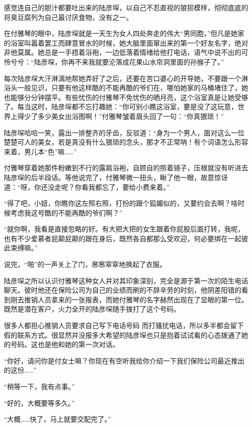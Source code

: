 \documentclass[11pt,a4paper]{article}
\begin{document}
感觉连自己的胆汁都要吐出来的陆彦堔，以自己不忍直视的狼狈模样，彻彻底底的将臭豆腐列为自己最讨厌食物，没有之一。﻿﻿

在付雅琴的眼中，陆彦堔就是一天生为女人四处奔走的伟大“男同胞，”但凡是她家的浴室叫嚣着罢工而肆意冒水的时候，她大脑里面窜出来的第一个好友名字，绝对非他莫属。她总是一手捂着浴袍，一边低落着情绪给他打电话，语气中说不出的可怜兮兮：“陆彦堔，你再不来我就要沦落成花果山水帘洞里面的孙猴子了。”﻿﻿

每次陆彦堔大汗淋漓地帮她弄好了之后，还要在苦口婆心的开导她，不要跟一个淋浴头一般见识，只要有他这样酷的不能再酷的爷们在，哪怕她家的马桶堵住了，她也能够分分钟摆平。有些忧伤的付雅琴不免忧伤的晒月亮，这个浴室真是让她受够了。每当这时，陆彦堔都不忘打趣她：“你可别小瞧这浴室，要是没了这玩意，世界上得少了多少美女出浴图啊！”付雅琴皱着眉头回了一句：“你真猥琐！”﻿﻿

陆彦堔哈哈一笑，露出一排整齐的牙齿，反驳道：“身为一个男人，面对这么一位楚楚可人的美女，若是真没有什么猥琐的念头，那才不正常呐！有个词语怎么形容来着，男儿本“色”嘛……”﻿﻿

付雅琴穿着她那件粉嫩到不行的露肩浴袍，自顾自的照着镜子，压根就没有听进去陆彦堔的后半段话。等他说完了，付雅琴微一扭头，瞅了他一眼，故意惊讶道：“呀，你还没走呢？你看我都忘了，要给小费来着。”﻿﻿

“得了吧，小妞，你瞧你这左照右照，打扮的跟个狐媚似的，又要约会去啊？啥时候考虑我这号酷的不能再酷的爷们啊？”﻿﻿

“就你啊，我看是直接忽略的好。有大把大把的女生跟着你屁股后面打转，我呢，也有不少爱慕者屁颠屁颠的跟在身后，既然各自都那么受欢迎，何必要绑在一起彼此束缚嘛。”﻿﻿

说完，“啪”的一声关上了门，窸窸窣窣地换起了衣服。﻿﻿

陆彦堔之所以认识付雅琴这种女人并对其印象深刻，完全是源于第一次的陌生电话聊天。彼时他还在保险公司为自己的业绩而刷的不辞辛劳的时刻，他阴差阳错的看到刚去推销人员拿来的一张报表，而她付雅琴的名字赫然出现在了显眼的第一位。既然是潜在客户，火力全开的陆彦堔随手拨打了这个号码。﻿﻿

很多人都担心推销人员要求自己写下电话号码 而打骚扰电话，所以多半都会留下假的联系方式。很显然并没报多大希望的陆彦堔也只是抱着试试看的心态拨通了她的号码。这也是他和她的第一次对话。﻿﻿

“你好，请问你是付女士嘛？你现在有空听我给你介绍一下我们保险公司最近推出的这份……”﻿﻿

“稍等一下，我有点事。”﻿﻿

“好的，大概要等多久。”﻿﻿

“大概……快了，马上就要交配完了。”﻿﻿
\end{document}
